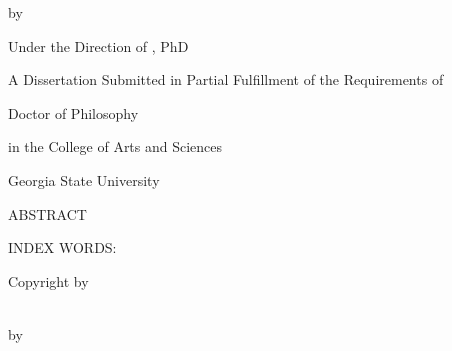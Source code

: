\documentclass[12pt]{report}
\providecommand{\titlediss}{}
\renewenvironment{abstract}{
\begin{center}
{ABSTRACT \vspace{0.2in}}
\end{center}
}{}
\begin{document}
\begin{center}
\parbox[]{\textwidth}{\centering\titlediss}
\end{center}
\vspace{0.4in}
\centerline{by}
\vspace*{0.5in}
\centerline{}
\vspace*{0.5in}
\centerline{Under the Direction of , PhD}
\vspace{1.0in}



\centerline{A Dissertation Submitted in Partial Fulfillment of the Requirements of }
\centerline{Doctor of Philosophy}
\centerline{in the College of Arts and Sciences}
\centerline{Georgia State University}
\centerline{}
\newpage

\newpage 

\begin{abstract}




\end{abstract} 
\begin{singlespace}
  \vspace{0.5in}
  \noindent INDEX WORDS:
  \hspace{0.2in}
  \parbox[t]{4.5in}{}
\end{singlespace}

\newpage

\vspace*{0.7\textheight}
\begin{center}
  \parbox[]{\textwidth}{
    \begin{center}
      Copyright by \\
       \\
      
    \end{center}}
\end{center}

\newpage






\begin{center}
  \parbox[]{\textwidth}{\centering \titlediss}
  \end{center}
  
  \vspace*{0.5in}
  \centerline{by}
  \vspace*{0.5in}
  \centerline{}
  \vspace*{1in}
  
\end{document}
